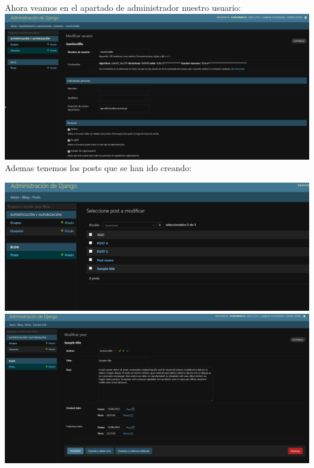 \documentclass{article}
\begin{document}
        \newline\newline\newline
        Ahora veamos en el apartado de administrador nuestro usuario:
        \newline\newline
        \includegraphics[width=16cm]{img/USUARIO.png}
        Ademas tenemos los posts que se han ido creando:\newline
    
        \includegraphics[width=16cm]{img/LISTADOposts.png}
        \newline\newline
        \includegraphics[width=16cm]{img/POSTejemplo.png}
        
\end{document}
